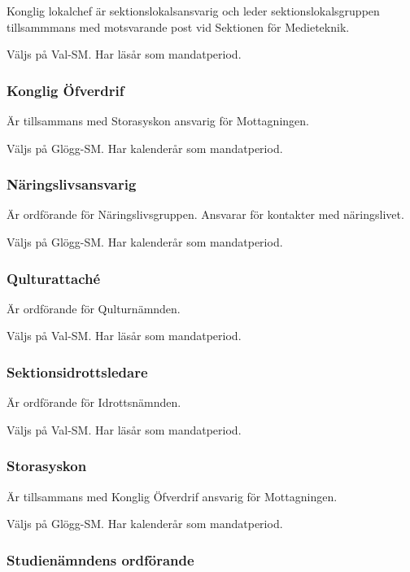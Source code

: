 \documentclass{dgovdoc}
\begin{document}
Konglig lokalchef är sektionslokalsansvarig och leder sektionslokalsgruppen
tillsammmans med motsvarande post vid Sektionen för Medieteknik.

Väljs på Val-SM. Har läsår som mandatperiod.

\subsubsection{Konglig Öfverdrif}

Är tillsammans med Storasyskon ansvarig för Mottagningen.

Väljs på Glögg-SM. Har kalenderår som mandatperiod.

\subsubsection{Näringslivsansvarig}

Är ordförande för Näringslivsgruppen. Ansvarar för kontakter med näringslivet.

Väljs på Glögg-SM. Har kalenderår som mandatperiod.

\subsubsection{Qulturattaché}

Är ordförande för Qulturnämnden.

Väljs på Val-SM. Har läsår som mandatperiod.

\subsubsection{Sektionsidrottsledare}

Är ordförande för Idrottsnämnden.

Väljs på Val-SM. Har läsår som mandatperiod.

\subsubsection{Storasyskon}

Är tillsammans med Konglig Öfverdrif ansvarig för Mottagningen.

Väljs på Glögg-SM. Har kalenderår som mandatperiod.

\subsubsection{Studienämndens ordförande}
\end{document}
